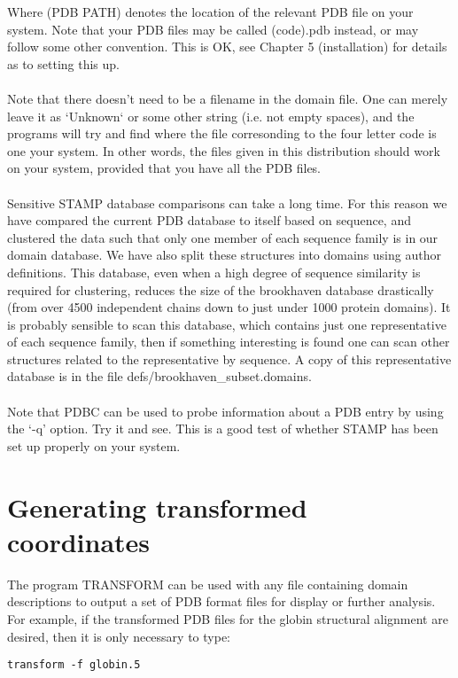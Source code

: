 Where (PDB PATH) denotes the location of the relevant PDB file on your 
system.   Note that your PDB files may be called (code).pdb instead, or
may follow some other convention.  This is OK, see Chapter 5 (installation) for
details as to setting this up.\\
\\
Note that there doesn't need to be a filename in the domain file.  One 
can merely leave it as `Unknown` or some other string (i.e. not empty 
spaces), and the programs will try and find where the file corresonding 
to the four letter code is one your system.  In other words, the files 
given in this distribution should work on your system, provided that
you have all the PDB files.\\
\\
Sensitive STAMP database comparisons can take a long time.  For this 
reason we have compared the current PDB database to itself based on 
sequence, and clustered the data such that only one member of each
sequence family is in our domain database.  We have also split
these structures into domains using author definitions.  This database, even
when a high degree of sequence similarity is required for
clustering, reduces the size of the brookhaven database
drastically (from over 4500 independent chains down to just under
1000 protein domains).  It is probably sensible to scan this
database, which contains just one representative of each sequence
family, then if something interesting is found one can scan other
structures related to the representative by sequence.
A copy of this representative database is in the file
defs/brookhaven\_subset.domains.\\
\\
Note that PDBC can be used to probe information about a PDB entry by
using the `-q' option.  Try it and see.   This is a good test of whether 
STAMP has been set up properly on your system.

\section{Generating transformed coordinates}

The program TRANSFORM can be used with any file containing domain
descriptions to output a set of PDB format files for display or
further analysis.  For example, if the transformed PDB files for
the globin structural alignment are desired, then it is only necessary to type:\\

\begin{scriptsize}\begin{verbatim}
transform -f globin.5
\end{verbatim} \end{scriptsize}

